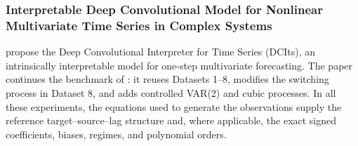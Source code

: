 \subsubsection{Interpretable Deep Convolutional Model for Nonlinear Multivariate Time Series in Complex Systems}

\citet{baric2026dcits} propose the Deep Convolutional Interpreter for Time
Series (DCIts), an intrinsically interpretable model for one-step multivariate
forecasting. The paper continues the benchmark of
\citet{baric2021benchmarking}: it reuses Datasets 1--8, modifies the switching
process in Dataset 8, and adds controlled VAR(2) and cubic processes. In all
these experiments, the equations used to generate the observations supply the
reference target--source--lag structure and, where applicable, the exact signed
coefficients, biases, regimes, and polynomial orders.

